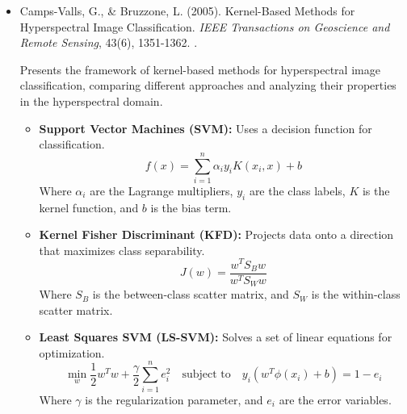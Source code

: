 \documentclass[10pt,svgnames,fragile]{beamer}
\begin{document}
\begin{frame}{}
\tiny
\begin{itemize}

    \item Camps-Valls, G., \& Bruzzone, L. (2005). Kernel-Based Methods for Hyperspectral Image Classification. \textit{IEEE Transactions on Geoscience and Remote Sensing}, 43(6), 1351-1362. \href{https://doi.org/10.1109/TGRS.2005.846154}{\color{blue}{DOI: 10.1109/TGRS.2005.846154}}.
    \cite{camps-vallsKernelbasedMethodsHyperspectral2005}
    
    {\color{gray}Presents the framework of kernel-based methods for hyperspectral image classification, comparing different approaches and analyzing their properties in the hyperspectral domain.}
    \begin{itemize} \tiny
    \item \textbf{Support Vector Machines (SVM):} Uses a decision function for classification.
    \[
    f(x) = \sum_{i=1}^{n} \alpha_i y_i K(x_i, x) + b
    \]
    Where \( \alpha_i \) are the Lagrange multipliers, \( y_i \) are the class labels, \( K \) is the kernel function, and \( b \) is the bias term.
    \item \textbf{Kernel Fisher Discriminant (KFD):} Projects data onto a direction that maximizes class separability.
    \[
    J(w) = \frac{w^T S_B w}{w^T S_W w}
    \]
    Where \( S_B \) is the between-class scatter matrix, and \( S_W \) is the within-class scatter matrix.
    \item \textbf{Least Squares SVM (LS-SVM):} Solves a set of linear equations for optimization.
    \[
    \min_w \frac{1}{2} w^T w + \frac{\gamma}{2} \sum_{i=1}^{n} e_i^2 \quad \text{subject to} \quad y_i (w^T \phi(x_i) + b) = 1 - e_i
    \]
    Where \( \gamma \) is the regularization parameter, and \( e_i \) are the error variables.
\end{itemize}
    
\end{itemize}
\end{frame}
\end{document}
